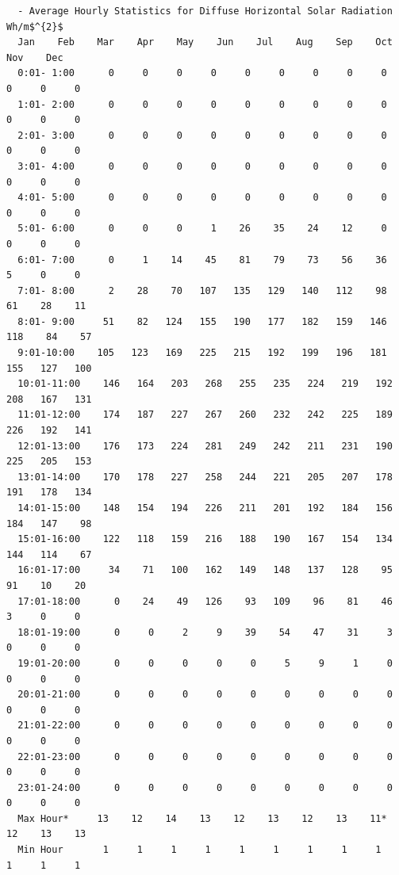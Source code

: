 \begin{lstlisting}
  - Average Hourly Statistics for Diffuse Horizontal Solar Radiation Wh/m$^{2}$
  Jan    Feb    Mar    Apr    May    Jun    Jul    Aug    Sep    Oct    Nov    Dec   
  0:01- 1:00      0     0     0     0     0     0     0     0     0     0     0     0 
  1:01- 2:00      0     0     0     0     0     0     0     0     0     0     0     0 
  2:01- 3:00      0     0     0     0     0     0     0     0     0     0     0     0 
  3:01- 4:00      0     0     0     0     0     0     0     0     0     0     0     0 
  4:01- 5:00      0     0     0     0     0     0     0     0     0     0     0     0 
  5:01- 6:00      0     0     0     1    26    35    24    12     0     0     0     0 
  6:01- 7:00      0     1    14    45    81    79    73    56    36     5     0     0 
  7:01- 8:00      2    28    70   107   135   129   140   112    98    61    28    11 
  8:01- 9:00     51    82   124   155   190   177   182   159   146   118    84    57 
  9:01-10:00    105   123   169   225   215   192   199   196   181   155   127   100 
  10:01-11:00    146   164   203   268   255   235   224   219   192   208   167   131 
  11:01-12:00    174   187   227   267   260   232   242   225   189   226   192   141 
  12:01-13:00    176   173   224   281   249   242   211   231   190   225   205   153 
  13:01-14:00    170   178   227   258   244   221   205   207   178   191   178   134 
  14:01-15:00    148   154   194   226   211   201   192   184   156   184   147    98 
  15:01-16:00    122   118   159   216   188   190   167   154   134   144   114    67 
  16:01-17:00     34    71   100   162   149   148   137   128    95    91    10    20 
  17:01-18:00      0    24    49   126    93   109    96    81    46     3     0     0 
  18:01-19:00      0     0     2     9    39    54    47    31     3     0     0     0 
  19:01-20:00      0     0     0     0     0     5     9     1     0     0     0     0 
  20:01-21:00      0     0     0     0     0     0     0     0     0     0     0     0 
  21:01-22:00      0     0     0     0     0     0     0     0     0     0     0     0 
  22:01-23:00      0     0     0     0     0     0     0     0     0     0     0     0 
  23:01-24:00      0     0     0     0     0     0     0     0     0     0     0     0 
  Max Hour*     13    12    14    13    12    13    12    13    11*   12    13    13  
  Min Hour       1     1     1     1     1     1     1     1     1     1     1     1  


\end{lstlisting}
